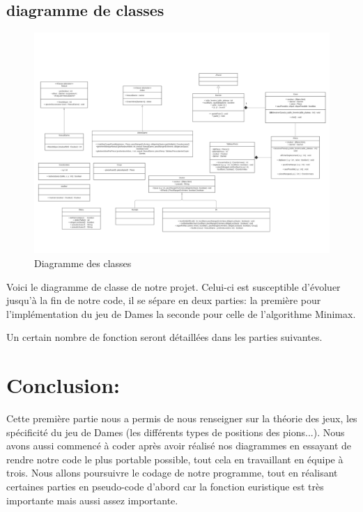 \documentclass[12,french]{report}
\begin{document}
\section{diagramme de classes}

\begin{figure}[H]
	\center
	\includegraphics[width=1\textwidth]{./Images/Diagramme_classe}
	\caption{Diagramme des classes}
\end{figure}\vspace{0.2cm}



Voici le diagramme de classe de notre projet. Celui-ci est susceptible
d'évoluer jusqu'à la fin de notre code, il se sépare en deux parties:
la première pour l'implémentation du jeu de Dames la seconde pour
celle de l'algorithme Minimax.

Un certain nombre de fonction seront détaillées dans les parties suivantes.

\chapter*{Conclusion:}

Cette première partie nous a permis de nous renseigner sur la théorie
des jeux, les spécificité du jeu de Dames (les différents types de
positions des pions...). Nous avons aussi commencé à coder après avoir
réalisé nos diagrammes en essayant de rendre notre code le plus portable
possible, tout cela en travaillant en équipe à trois. Nous allons
poursuivre le codage de notre programme, tout en réalisant certaines
parties en pseudo-code d'abord car la fonction euristique est très
importante mais aussi assez importante.\\
\end{document}
